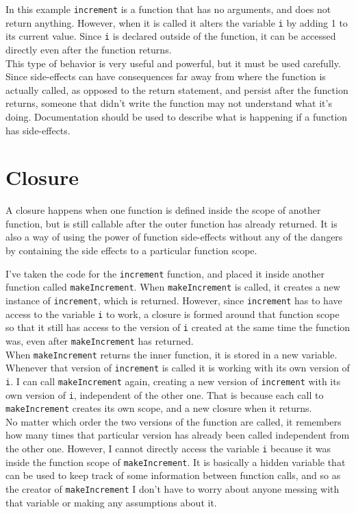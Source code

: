 
In this example \texttt{increment} is a function that has no arguments, and does not return anything. However, when it is called it alters the variable \texttt{i} by adding 1 to its current value. Since \texttt{i} is declared outside of the function, it can be accessed directly even after the function returns.\\

This type of behavior is very useful and powerful, but it must be used carefully. Since side-effects can have consequences far away from where the function is actually called, as opposed to the return statement, and persist after the function returns, someone that didn't write the function may not understand what it's doing. Documentation should be used to describe what is happening if a function has side-effects.\\

\section{Closure}

A closure happens when one function is defined inside the scope of another function, but is still callable after the outer function has already returned. It is also a way of using the power of function side-effects without any of the dangers by containing the side effects to a particular function scope.


I've taken the code for the \texttt{increment} function, and placed it inside another function called \texttt{makeIncrement}. When \texttt{makeIncrement} is called, it creates a new instance of \texttt{increment}, which is returned. However, since \texttt{increment} has to have access to the variable \texttt{i} to work, a closure is formed around that function scope so that it still has access to the version of \texttt{i} created at the same time the function was, even after \texttt{makeIncrement} has returned.\\

When \texttt{makeIncrement} returns the inner function, it is stored in a new variable. Whenever that version of \texttt{increment} is called it is working with its own version of \texttt{i}. I can call \texttt{makeIncrement} again, creating a new version of \texttt{increment} with its own version of \texttt{i}, independent of the other one. That is because each call to \texttt{makeIncrement} creates its own scope, and a new closure when it returns.\\

No matter which order the two versions of the function are called, it remembers how many times that particular version has already been called independent from the other one. However, I cannot directly access the variable \texttt{i} because it was inside the function scope of \texttt{makeIncrement}. It is basically a hidden variable that can be used to keep track of some information between function calls, and so as the creator of \texttt{makeIncrement} I don't have to worry about anyone messing with that variable or making any assumptions about it.\\